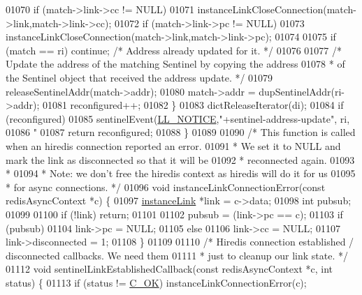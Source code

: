 \begin{DoxyCode}
{{{{{{{{{{{{{{{01070         \textcolor{keywordflow}{if} (match->link->cc != NULL)
01071             instanceLinkCloseConnection(match->link,match->link->cc);
01072         \textcolor{keywordflow}{if} (match->link->pc != NULL)
01073             instanceLinkCloseConnection(match->link,match->link->pc);
01074 
01075         \textcolor{keywordflow}{if} (match == ri) \textcolor{keywordflow}{continue}; \textcolor{comment}{/* Address already updated for it. */}
01076 
01077         \textcolor{comment}{/* Update the address of the matching Sentinel by copying the address}
01078 \textcolor{comment}{         * of the Sentinel object that received the address update. */}
01079         releaseSentinelAddr(match->addr);
01080         match->addr = dupSentinelAddr(ri->addr);
01081         reconfigured++;
01082     \}
01083     dictReleaseIterator(di);
01084     \textcolor{keywordflow}{if} (reconfigured)
01085         sentinelEvent(\hyperlink{server_8h_a8c54c191e436c7dd3012167212692401}{LL\_NOTICE},\textcolor{stringliteral}{"+sentinel-address-update"}, ri,
01086                     \textcolor{stringliteral}{"%
01087     \textcolor{keywordflow}{return} reconfigured;
01088 \}
01089 
01090 \textcolor{comment}{/* This function is called when an hiredis connection reported an error.}
01091 \textcolor{comment}{ * We set it to NULL and mark the link as disconnected so that it will be}
01092 \textcolor{comment}{ * reconnected again.}
01093 \textcolor{comment}{ *}
01094 \textcolor{comment}{ * Note: we don't free the hiredis context as hiredis will do it for us}
01095 \textcolor{comment}{ * for async connections. */}
01096 \textcolor{keywordtype}{void} instanceLinkConnectionError(\textcolor{keyword}{const} redisAsyncContext *c) \{
01097     \hyperlink{structinstanceLink}{instanceLink} *link = c->data;
01098     \textcolor{keywordtype}{int} pubsub;
01099 
01100     \textcolor{keywordflow}{if} (!link) \textcolor{keywordflow}{return};
01101 
01102     pubsub = (link->pc == c);
01103     \textcolor{keywordflow}{if} (pubsub)
01104         link->pc = NULL;
01105     \textcolor{keywordflow}{else}
01106         link->cc = NULL;
01107     link->disconnected = 1;
01108 \}
01109 
01110 \textcolor{comment}{/* Hiredis connection established / disconnected callbacks. We need them}
01111 \textcolor{comment}{ * just to cleanup our link state. */}
01112 \textcolor{keywordtype}{void} sentinelLinkEstablishedCallback(\textcolor{keyword}{const} redisAsyncContext *c, \textcolor{keywordtype}{int} status) \{
01113     \textcolor{keywordflow}{if} (status != \hyperlink{server_8h_a303769ef1065076e68731584e758d3e1}{C\_OK}) instanceLinkConnectionError(c);
}}}}}}}}}}}}}}}}
\end{DoxyCode}
